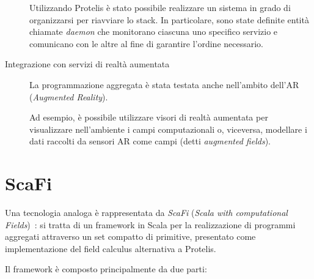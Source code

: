 \begin{description}
    Utilizzando Protelis è stato possibile realizzare un sistema in grado di organizzarsi per riavviare lo stack.
    In particolare, sono state definite entità chiamate \emph{daemon} che monitorano ciascuna uno specifico servizio e comunicano con le altre al fine di garantire l'ordine necessario.

  \item[Integrazione con servizi di realtà aumentata]\cite{PCRV-SCOPES2015}
    La programmazione aggregata è stata testata anche nell'ambito dell'AR (\emph{Augmented Reality}).

    Ad esempio, è possibile utilizzare visori di realtà aumentata per visualizzare nell'ambiente i campi computazionali
    o, viceversa, modellare i dati raccolti da sensori AR come campi (detti \emph{augmented fields}).
\end{description}


\section{ScaFi}\label{sec:scafi}

Una tecnologia analoga è rappresentata da \emph{ScaFi} (\emph{\emph{Sca}la with computational \emph{Fi}elds})~\cite{aggregatescala-pmldc2016}:
si tratta di un framework in Scala per la realizzazione di programmi aggregati attraverso un set compatto di primitive, presentato come implementazione del field calculus alternativa a Protelis.

Il framework è composto principalmente da due parti:


